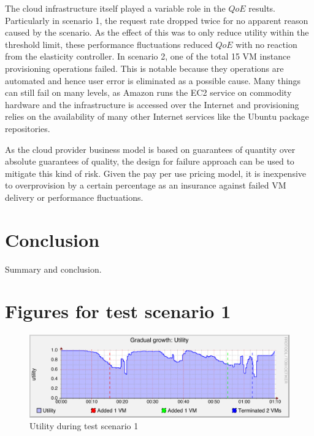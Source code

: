 \documentclass[english]{tktltiki2}
\theoremstyle{definition}
\theoremstyle{remark}
\begin{document}
The cloud infrastructure itself played a variable role in the $QoE$ results.
Particularly in scenario 1, the request rate dropped twice for no apparent
reason caused by the scenario. As the effect of this was to only reduce utility
within the threshold limit, these performance fluctuations reduced $QoE$ with no
reaction from the elasticity controller. In scenario 2, one of the total 15 VM
instance provisioning operations failed. This is notable because they operations
are automated and hence user error is eliminated as a possible cause. Many
things can still fail on many levels, as Amazon runs the EC2 service on
commodity hardware and the infrastructure is accessed over the Internet and
provisioning relies on the availability of many other Internet services like the
Ubuntu package repositories. 

As the cloud provider business model is based on
guarantees of quantity over absolute guarantees of quality, the design for
failure approach  can be used to mitigate
this kind of risk. Given the pay per use pricing model, it is inexpensive to
overprovision by a certain percentage as an insurance against failed VM delivery
or performance fluctuations.


\section{Conclusion}
\label{conclusion}

Summary and conclusion.


\clearpage
\appendix

\section{Figures for test scenario 1}

\begin{figure}[htbp]
	\includegraphics[width=\textwidth]{images/utilitygraph-test21}
	\caption{Utility during test scenario 1}
	\label{fig:utilityScenario1}
\end{figure}
\end{document}
